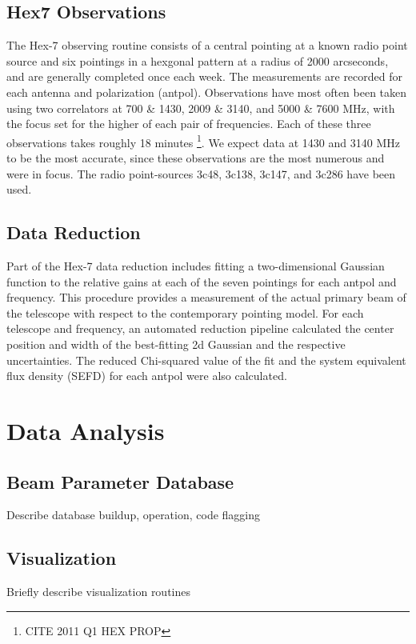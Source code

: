 \documentclass[preprint]{aastex}
\begin{document}
\subsection{Hex7 Observations}\label{ss.observations}
The Hex-7 observing routine consists of a central pointing at a known radio point source and six pointings in a hexgonal pattern at a radius of 2000 arcseconds, and are generally completed once each week.  The measurements are recorded for each antenna and polarization (antpol). Observations have most often been taken using two correlators at 700 \& 1430, 2009 \& 3140, and 5000 \& 7600 MHz, with the focus set for the higher of each pair of frequencies.  Each of these three observations takes roughly 18 minutes \footnote{CITE 2011 Q1 HEX PROP}. We expect data at 1430 and 3140 MHz to be the most accurate, since these observations are the most numerous and were in focus. The radio point-sources 3c48, 3c138, 3c147, and 3c286 have been used.

\subsection{Data Reduction}\label{ss.reduction}
Part of the Hex-7 data reduction includes fitting a two-dimensional Gaussian function to the relative gains at each of the seven pointings for each antpol and frequency.  This procedure provides a measurement of the actual primary beam of the telescope with respect to the contemporary pointing model.  For each telescope and frequency, an automated reduction pipeline calculated the center position and width of the best-fitting 2d Gaussian and the respective uncertainties.  The reduced Chi-squared value of the fit and the system equivalent flux density (SEFD) for each antpol were also calculated.

\section{Data Analysis}\label{s.analysis}

\subsection{Beam Parameter Database}\label{ss.database}
Describe database buildup, operation, code
flagging

\subsection{Visualization}\label{ss.visualization}
Briefly describe visualization routines
\end{document}
